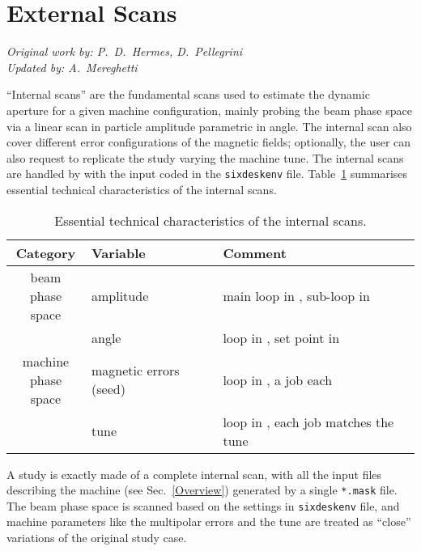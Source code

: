 \section{External Scans} \label{ExternalScans}
\begin{flushright}
\emph{Original work by: P.~D.~Hermes, D.~Pellegrini} \\
\emph{Updated by: A.~Mereghetti}
\end{flushright}
``Internal scans'' are the fundamental scans used to estimate the dynamic
aperture for a given machine configuration, mainly probing the beam phase
space via a linear scan in particle amplitude parametric in angle.
The internal scan also cover different error
configurations of the magnetic fields; optionally, the user can also request
to replicate the study varying the machine tune.
The internal scans are handled by \SIXDESK{} with the input coded
in the \texttt{sixdeskenv} file.
Table~\ref{tab:InternalScanParamters} summarises essential technical
characteristics of the internal scans.
\begin{table}[t]
\begin{center}
    \caption{Essential technical
      characteristics of the internal scans.}
    \label{tab:InternalScanParamters}
    \begin{tabular}{|c|l|l|}
    \hline
    \rowcolor{blue!30}
    \textbf{Category} & \textbf{Variable} & \textbf{Comment} \\
    \hline
    \multirowcell{2}{beam \\ phase space}
    & amplitude & main loop in \SIXDESK{}, sub-loop in \SIXTRACK{} \\
    \cline{2-3}
    & angle     & loop in \SIXDESK{}, set point in \SIXTRACK{} \\
    \hline
    \multirowcell{2}{machine \\ phase space}
    & magnetic errors (seed) & loop in \SIXDESK{}, a \MADX{} job each\\
    \cline{2-3}
    & tune & loop in \SIXDESK{}, each \SIXTRACK{} job matches the tune \\
    \hline
    \end{tabular}
\end{center}
\end{table}

A \SIXDESK{} study is exactly made of a complete internal scan, with all the
\SIXTRACK{} input files describing the machine (see Sec.~\ref{Overview})
generated by a single \texttt{*.mask} file. The beam phase space is scanned
based on the settings in \texttt{sixdeskenv} file, and machine parameters like
the multipolar errors and the tune are treated as ``close'' variations of the
original study case.

